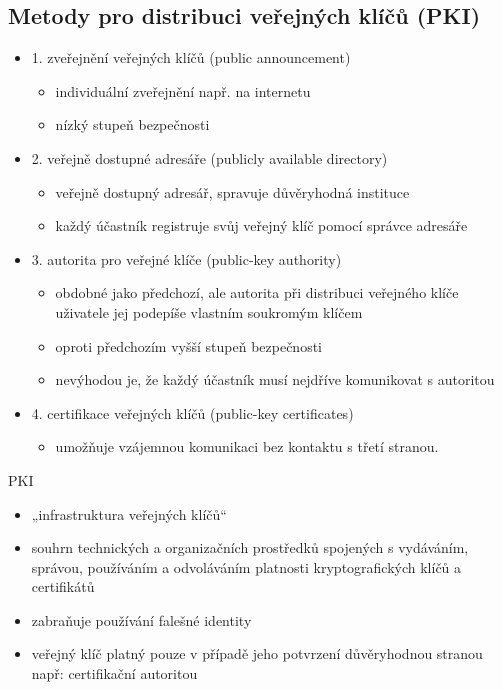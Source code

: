 \subsection{Metody pro distribuci veřejných klíčů (PKI)}
\begin{itemize}
    \item 1. zveřejnění veřejných klíčů (public announcement)
\begin{itemize}
    \item individuální zveřejnění např. na internetu
    \item nízký stupeň bezpečnosti
\end{itemize}
\item 2. veřejně dostupné adresáře (publicly available directory)
\begin{itemize}
    \item veřejně dostupný adresář, spravuje důvěryhodná instituce
    \item každý účastník registruje svůj veřejný klíč pomocí správce adresáře
\end{itemize}
\item 3. autorita pro veřejné klíče (public-key authority)
\begin{itemize}
    \item obdobné jako předchozí, ale autorita při distribuci veřejného klíče uživatele jej podepíše vlastním soukromým klíčem
    \item oproti předchozím vyšší stupeň bezpečnosti
    \item nevýhodou je, že každý účastník musí nejdříve komunikovat s autoritou
\end{itemize}
\item 4. certifikace veřejných klíčů (public-key certificates)
\begin{itemize}
    \item umožňuje vzájemnou komunikaci bez kontaktu s třetí stranou.
\end{itemize}
\end{itemize}

PKI
\begin{itemize}
    \item „infrastruktura veřejných klíčů“
    \item souhrn technických a organizačních prostředků spojených s vydáváním, správou, používáním a odvoláváním platnosti kryptografických klíčů a certifikátů
    \item zabraňuje používání falešné identity
    \item veřejný klíč platný pouze v případě jeho potvrzení důvěryhodnou stranou např: certifikační autoritou
\end{itemize}



